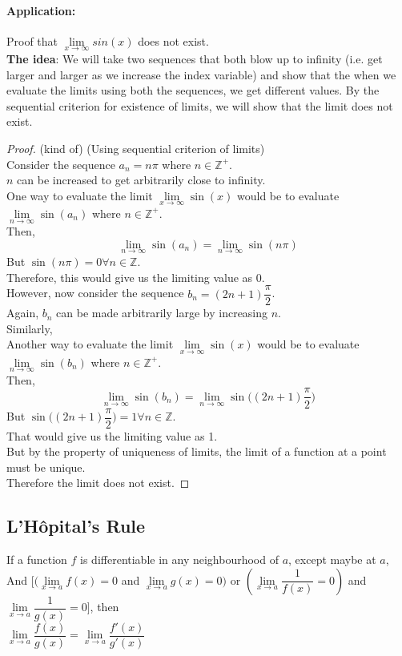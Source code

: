 \documentclass[14]{article}
\theoremstyle{definition}
\begin{document}
\paragraph{Application:}
Proof that $\lim\limits_{x \to \infty} sin(x)$ does not exist.\\
\textbf{The idea}: We will take two sequences that both blow up to infinity (i.e. get larger and larger as we increase the index variable) and show that the when we evaluate the limits using both the sequences, we get different values. By the sequential criterion for existence of limits, we will show that the limit does not exist.
\begin{proof} (kind of) (Using sequential criterion of limits)\\
Consider the sequence $a_n = n \pi$ where $n \in \mathbb{Z^+}$.\\
$n$ can be increased to get arbitrarily close to infinity.\\
One way to evaluate the limit $\lim\limits_{x \to \infty} \sin(x)$ would be to evaluate $\lim\limits_{n \to \infty}\sin(a_n)$ where $n \in \mathbb{Z^+}$.\\
Then,
\[\lim\limits_{n \to \infty}\sin(a_n)= \lim\limits_{n \to \infty} \sin(n\pi)\]
But $\sin(n\pi) = 0 \forall n \in \mathbb{Z}$.\\
Therefore, this would give us the limiting value as $0$.\\
However, now consider the sequence $b_n = (2n+1)\dfrac{\pi}{2}$.\\
Again, $b_n$ can be made arbitrarily large by increasing $n$.\\
Similarly, \\Another way to evaluate the limit $\lim\limits_{x \to \infty} \sin(x)$ would be to evaluate $\lim\limits_{n \to \infty}\sin(b_n)$ where $n \in \mathbb{Z^+}$.\\
Then,
\[\lim\limits_{n\to \infty} \sin(b_n) = \lim\limits_{n \to \infty} \sin\Big((2n+1)\dfrac{\pi}{2}\Big)\]
But $\sin\Big((2n+1)\dfrac{\pi}{2}\Big) = 1 \forall n \in \mathbb{Z}$.\\
That would give us the limiting value as 1.\\
But by the property of uniqueness of limits, the limit of a function at a point must be unique.\\Therefore the limit does not exist.
\end{proof}
\subsection{L'Hôpital's Rule}
If a function $f$ is differentiable in any neighbourhood of $a$, except maybe at $a$,\\
And $\Big[(\lim\limits_{x \to a} f(x) = 0$ and $\lim\limits_{x \to a} g(x) = 0)$ or $(\lim\limits_{x \to a}\dfrac{1}{f(x)} = 0)$ and $\lim\limits_{x \to a} \dfrac{1}{g(x)} = 0\Big]$, then\\
$\lim\limits_{x \to a} \dfrac{f(x)}{g(x)} = \lim\limits_{x \to a} \dfrac{f'(x)}{g'(x)}$
\end{document}
